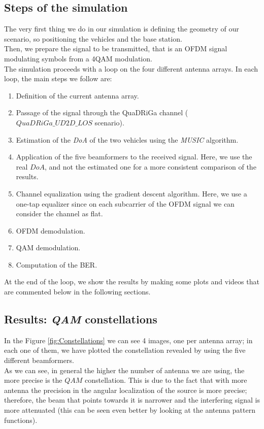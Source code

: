 \subsection{Steps of the simulation}

The very first thing we do in our simulation is defining the geometry of our scenario, so positioning the vehicles and the base station.\\
Then, we prepare the signal to be transmitted, that is an OFDM signal modulating symbols from a 4\-QAM modulation.\\
The simulation proceeds with a loop on the four different antenna arrays. In each loop, the main steps we follow are:

\begin{enumerate}
    \item Definition of the current antenna array.
    \item Passage of the signal through the QuaDRiGa channel ($QuaDRiGa\_UD2D\_LOS$ scenario).
    \item Estimation of the \textit{DoA} of the two vehicles using the \textit{MUSIC} algorithm.
    \item Application of the five beamformers to the received signal. Here, we use the real $DoA$, and not the estimated one
            for a more consistent comparison of the results.
    \item Channel equalization using the gradient descent algorithm. Here, we use a one-tap equalizer since on each subcarrier 
            of the OFDM signal we can consider the channel as flat.
    \item OFDM demodulation.
    \item QAM demodulation.
    \item Computation of the BER.
\end{enumerate}

At the end of the loop, we show the results by making some plots and videos that are commented below in the following sections.

\subsection{Results: \textit{QAM} constellations}

In the Figure \ref{fig:Constellations} we can see 4 images, one per antenna array; in each one of them, we have
plotted the constellation revealed by using the five different beamformers. \\ 
As we can see, in general the higher the number of antenna we are using, the more precise is the $QAM$ constellation. This
is due to the fact that with more antenna the precision in the angular localization of the source is more precise; therefore, 
the beam that points towards it is narrower and the interfering signal is more attenuated (this can be seen even better by
looking at the antenna pattern functions).

